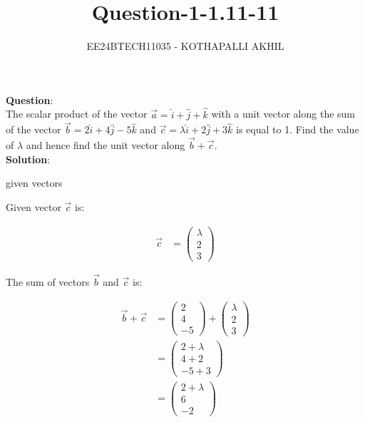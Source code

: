\documentclass[journal]{IEEEtran}
\numberwithin{figure}{enumi}
\begin{document}

\title{Question-1-1.11-11}
\author{EE24BTECH11035 - KOTHAPALLI AKHIL}
{\let\newpage\relax\maketitle}
\vspace{-10mm}
\textbf{Question}:\\
The scalar product of the vector $\vec{a}=\hat{i}+\hat{j}+\hat{k}$ with a unit vector along the sum of the vector $\vec{b}=2\hat{i}+4\hat{j}-5\hat{k}$ and $\vec{c}=\lambda\hat{i}+2\hat{j}+3\hat{k}$ is equal to 1. Find the  value of $\lambda$ and hence find the  unit vector along $\Vec{b}+\Vec{c}$.\\
\textbf{Solution}:\\
\begin{table}[h!]
   \centering
   
   \caption{given vectors}
   \label{tabQuestion-1-1.11-11}
\end{table}   

Given vector $\vec{c}$ is:

\begin{align}
\vec{c} &= \begin{pmatrix} \lambda \\ 2 \\ 3 \end{pmatrix}
\end{align}

The sum of vectors $\vec{b}$ and $\vec{c}$ is:

\begin{align}
\vec{b} + \vec{c} &= \begin{pmatrix} 2 \\ 4 \\ -5 \end{pmatrix} + \begin{pmatrix} \lambda \\ 2 \\ 3 \end{pmatrix} \\
&= \begin{pmatrix} 2 + \lambda \\ 4 + 2 \\ -5 + 3 \end{pmatrix} \\
&= \begin{pmatrix} 2 + \lambda \\ 6 \\ -2 \end{pmatrix}
\end{align}
\end{document}
